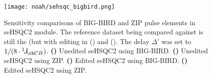 \begin{figure}[!ht]
    \centering
    \texttt{[image: noah/sehsqc\_bigbird.png]}%
    {\label{fig:noah_sehsqc_bigbird_bb_noed}}%
    {\label{fig:noah_sehsqc_bigbird_zip_noed}}%
    {\label{fig:noah_sehsqc_bigbird_bb_ed}}%
    {\label{fig:noah_sehsqc_bigbird_zip_ed}}%
    \caption[Comparison of BIG-BIRD and ZIP pulse elements in seHSQC2 module]{
        Sensitivity comparisons of BIG-BIRD and ZIP pulse elements in seHSQC2 module.
        The reference dataset being compared against is still the  (but with editing in () and ().
        The delay $\Delta'$ was set to $1 / (8 \cdot \oneJ{CH})$.
        \textbf{()} Unedited seHSQC2 using BIG-BIRD.
        \textbf{()} Unedited seHSQC2 using ZIP.
        \textbf{()} Edited seHSQC2 using BIG-BIRD.
        \textbf{()} Edited seHSQC2 using ZIP.
    }
    \label{fig:noah_sehsqc_bigbird}
\end{figure}
